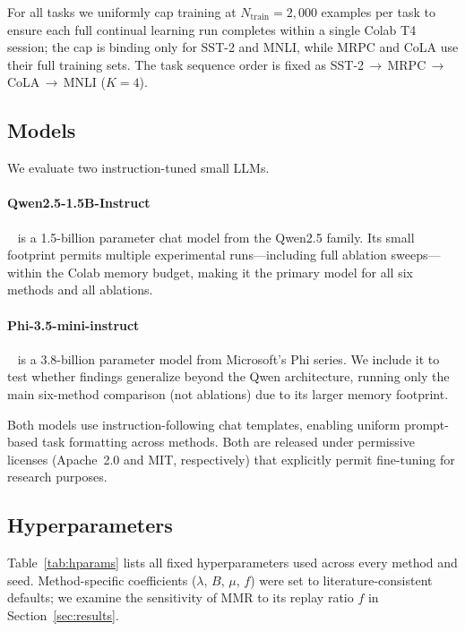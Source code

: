 For all tasks we uniformly cap training at $N_{\mathrm{train}} = 2{,}000$ examples per task to
ensure each full continual learning run completes within a single Colab T4 session; the cap is
binding only for SST-2 and MNLI, while MRPC and CoLA use their full training sets.
The task sequence order is fixed as SST-2\,$\to$\,MRPC\,$\to$\,CoLA\,$\to$\,MNLI ($K = 4$).

\subsection{Models}

We evaluate two instruction-tuned small LLMs.

\paragraph{Qwen2.5-1.5B-Instruct}~\cite{qwen2024} is a 1.5-billion parameter chat model from the
Qwen2.5 family.
Its small footprint permits multiple experimental runs---including full ablation sweeps---within the
Colab memory budget, making it the primary model for all six methods and all ablations.

\paragraph{Phi-3.5-mini-instruct}~\cite{abdin2024phi3} is a 3.8-billion parameter model from
Microsoft's Phi series.
We include it to test whether findings generalize beyond the Qwen architecture, running only the
main six-method comparison (not ablations) due to its larger memory footprint.

Both models use instruction-following chat templates, enabling uniform prompt-based task formatting
across methods.
Both are released under permissive licenses (Apache~2.0 and MIT, respectively) that explicitly
permit fine-tuning for research purposes.

\subsection{Hyperparameters}

Table~\ref{tab:hparams} lists all fixed hyperparameters used across every method and seed.
Method-specific coefficients ($\lambda$, $B$, $\mu$, $f$) were set to literature-consistent
defaults; we examine the sensitivity of MMR to its replay ratio $f$ in
Section~\ref{sec:results}.

